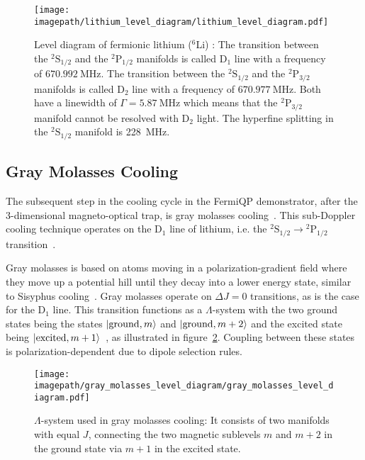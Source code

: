 \begin{figure}
    \centering
    \texttt{[image: \\imagepath/lithium\_level\_diagram/lithium\_level\_diagram.pdf]}
    \caption{Level diagram of fermionic lithium ($^6$Li) \cite{gehm_properties_2003, scherf_re-measurement_1996}: The transition between the  $^2\text{S}_{1/2}$ and the $^2\text{P}_{1/2}$ manifolds is called D$_1$ line with a frequency of $\SI{670.992}{\mega\hertz}$. The transition between the  $^2\text{S}_{1/2}$ and the $^2\text{P}_{3/2}$ manifolds is called D$_2$ line with a frequency of $\SI{670.977}{\mega\hertz}$. Both have a linewidth of $\Gamma = \SI{5.87}{\mega\hertz}$ which means that the $^2\text{P}_{3/2}$ manifold cannot be resolved with D$_2$ light. The hyperfine splitting in the $^2\text{S}_{1/2}$ manifold is \SI{228}{\mega\hertz}.}
    \label{fig:lithium_level_diagram}
\end{figure}

\subsection*{Gray Molasses Cooling}
The subsequent step in the cooling cycle in the FermiQP demonstrator, after the 3-dimensional magneto-optical trap, is gray molasses cooling~\cite{grynberg_proposal_1994,weidemuller_novel_1994}. This sub-Doppler cooling technique operates on the D$_1$ line of lithium, i.e. the $^2\text{S}_{1/2} \rightarrow {^2\text{P}_{1/2}}$ transition~\cite{burchianti_efficient_2014}.

Gray molasses is based on atoms moving in a polarization-gradient field where they move up a potential hill until they decay into a lower energy state, similar to Sisyphus cooling~\cite{foot_atomic_2005}. Gray molasses operate on $\Delta J = 0$ transitions, as is the case for the D$_1$ line. This transition functions as a $\Lambda$-system with the two ground states being the states $\Ket{\text{ground}, m}$ and $\Ket{\text{ground}, m + 2}$ and the excited state being $\Ket{\text{excited}, m + 1}$~\cite{weidemuller_novel_1994}, as illustrated in figure~\ref{fig:gray_molasses_level_diagram}. Coupling between these states is polarization-dependent due to dipole selection rules.
\begin{figure}
    \centering
    \texttt{[image: \\imagepath/gray\_molasses\_level\_diagram/gray\_molasses\_level\_diagram.pdf]}
    \caption{$\Lambda$-system used in gray molasses cooling: It consists of two manifolds with equal $J$, connecting the two magnetic sublevels $m$ and $m+2$ in the ground state via $m+1$ in the excited state.}
    \label{fig:gray_molasses_level_diagram}
\end{figure}

